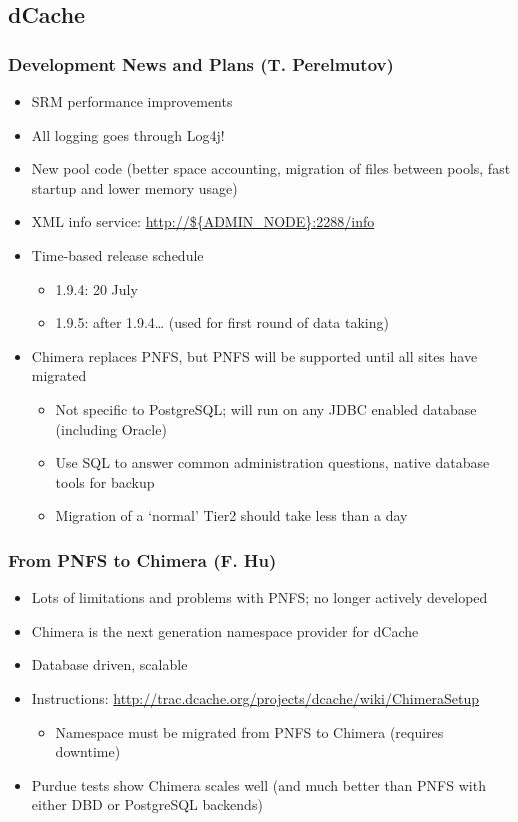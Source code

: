 \documentclass{beamer}
\begin{document}
\subsection{dCache}

\begin{frame}
\frametitle{Development News and Plans (T. Perelmutov)}
\begin{itemize}
	\item SRM performance improvements
	\item All logging goes through Log4j!
	\item New pool code (better space accounting, migration of files between pools, fast startup and lower memory usage)
	\item XML info service: \url{http://${ADMIN\_NODE}:2288/info}
	\item Time-based release schedule
	\begin{itemize}
		\item 1.9.4: 20 July
		\item 1.9.5: after 1.9.4\ldots{} (used for first round of data taking)
	\end{itemize}
	\item Chimera replaces PNFS, but PNFS will be supported until all sites have migrated
	\begin{itemize}
		\item Not specific to PostgreSQL; will run on any JDBC enabled database (including Oracle)
		\item Use SQL to answer common administration questions, native database tools for backup
		\item Migration of a `normal' Tier2 should take less than a day
	\end{itemize}
\end{itemize}
\end{frame}

\begin{frame}
\frametitle{From PNFS to Chimera (F. Hu)}
\begin{itemize}
	\item Lots of limitations and problems with PNFS; no longer actively developed
	\item Chimera is the next generation namespace provider for dCache
	\item Database driven, scalable
	\item Instructions: \url{http://trac.dcache.org/projects/dcache/wiki/ChimeraSetup}
	\begin{itemize}
		\item Namespace must be migrated from PNFS to Chimera (requires downtime)
	\end{itemize}
	\item Purdue tests show Chimera scales well (and much better than PNFS with either DBD or PostgreSQL backends)
\end{itemize}
\end{frame}
\end{document}
